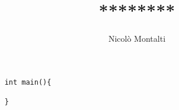 \documentclass[a4paper,10pt]{article}
\title{********}
\author{Nicolò Montalti}
\date{}
\begin{document}
\maketitle
\thispagestyle{empty}

\begin{verbatim}
    int main(){
        
    }
\end{verbatim}
\end{document}
